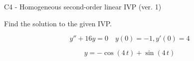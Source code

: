 \begin{exercise}
  \begin{exerciseTitle}C4 - Homogeneous second-order linear IVP (ver. 1)\end{exerciseTitle}
  \begin{exerciseStatement}
    
Find the solution to the given IVP.

    
\[y''+16y = 0 \hspace{1em} y(0) = -1 , y'(0) = 4\]

  \end{exerciseStatement}
  \begin{exerciseAnswer}
    
\[y= -\cos\left(4 \, t\right) + \sin\left(4 \, t\right)\]

  \end{exerciseAnswer}
\end{exercise}
